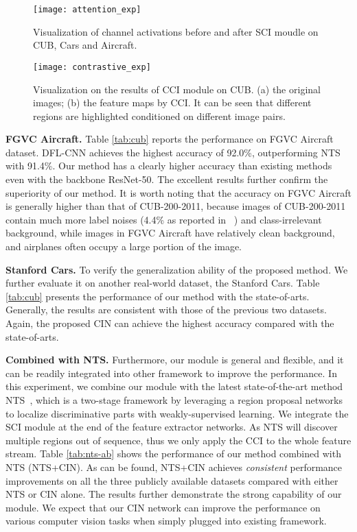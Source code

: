 \documentclass[letterpaper]{article} \usepackage{aaai20}  \usepackage{times}  \usepackage{helvet} \usepackage{courier}  \usepackage[hyphens]{url}  \usepackage{graphicx} \urlstyle{rm} \def\UrlFont{\rm}  \usepackage{graphicx}  \frenchspacing  \setlength{\pdfpagewidth}{8.5in}  \setlength{\pdfpageheight}{11in}  \usepackage{amsmath,amssymb}
\begin{document}
\begin{figure}[t]
\begin{center}
\texttt{[image: attention\_exp]}
\end{center}
\caption{Visualization of channel activations before and after SCI moudle on CUB, Cars and Aircraft.}
\label{exp:attention}
\end{figure}

\begin{figure}[t]
\begin{center}
\texttt{[image: contrastive\_exp]}
\end{center}
\caption{Visualization on the results of CCI module on CUB. (a) the original images; (b) the feature maps by CCI. It can be seen that different regions are highlighted conditioned on different image pairs.}
\label{exp:contrastive}
\end{figure}

\textbf{FGVC Aircraft.} Table \ref{tab:cub} reports the performance on FGVC Aircraft dataset.
DFL-CNN achieves the highest accuracy of 92.0\%, outperforming  NTS with 91.4\%.
Our method has a clearly higher accuracy than existing methods even with the backbone ResNet-50. The excellent results further confirm the superiority of our method. It is worth noting that the accuracy on FGVC Aircraft is generally higher than that of CUB-200-2011, because images of CUB-200-2011 contain much more label noises (4.4\% as reported in ~\cite{van2015building}) and class-irrelevant background, while images in FGVC Aircraft have relatively clean background, and airplanes often occupy a large portion of the image.

\textbf{Stanford Cars.} To verify the generalization ability of the proposed method.
 We further evaluate it on another real-world dataset, the Stanford Cars. Table \ref{tab:cub} presents the performance of our method with the state-of-arts. Generally, the results are consistent with those of the previous two datasets. Again, the proposed CIN can achieve the highest accuracy compared with the state-of-arts.


\textbf{Combined with NTS.} Furthermore, our module is general and flexible, and it can be readily integrated into other framework to improve the performance. In this experiment, we combine our module with the latest state-of-the-art method NTS~\cite{yang2018learning}, which is a two-stage framework by leveraging a region proposal networks to localize discriminative parts with weakly-supervised learning. We integrate the SCI module at the end of the feature extractor networks. As NTS will discover multiple regions out of sequence, thus we only apply the CCI to the whole feature stream. Table \ref{tab:nts-ab} shows the performance of our method combined with NTS (NTS+CIN). As can be found, NTS+CIN achieves \emph{consistent} performance improvements on all the three publicly available datasets compared with either NTS or CIN alone. The results further demonstrate the strong capability of our module. We expect that our CIN network can improve the performance on various computer vision tasks when simply plugged into existing framework.
\end{document}
